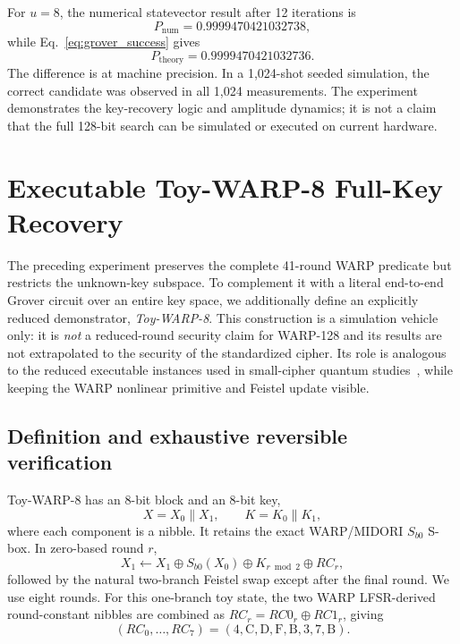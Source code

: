 \documentclass[10pt,a4paper]{article}
\begin{document}
For $u=8$, the numerical statevector result after 12 iterations is
\begin{equation}
    P_{\mathrm{num}}=0.9999470421032738,
\end{equation}
while Eq.~\eqref{eq:grover_success} gives
\begin{equation}
    P_{\mathrm{theory}}=0.9999470421032736.
\end{equation}
The difference is at machine precision. In a 1,024-shot seeded simulation, the correct candidate was observed in all 1,024 measurements. The experiment demonstrates the key-recovery logic and amplitude dynamics; it is not a claim that the full 128-bit search can be simulated or executed on current hardware.


\section{Executable Toy-WARP-8 Full-Key Recovery}
\label{sec:toywarp8}

The preceding experiment preserves the complete 41-round WARP predicate but restricts the unknown-key subspace.  To complement it with a literal end-to-end Grover circuit over an entire key space, we additionally define an explicitly reduced demonstrator, \emph{Toy-WARP-8}.  This construction is a simulation vehicle only: it is \emph{not} a reduced-round security claim for WARP-128 and its results are not extrapolated to the security of the standardized cipher.  Its role is analogous to the reduced executable instances used in small-cipher quantum studies~\cite{Kiran2026}, while keeping the WARP nonlinear primitive and Feistel update visible.

\subsection{Definition and exhaustive reversible verification}
Toy-WARP-8 has an 8-bit block and an 8-bit key,
\begin{equation}
    X=X_0\|X_1,\qquad K=K_0\|K_1,
\end{equation}
where each component is a nibble.  It retains the exact WARP/MIDORI $S_{b0}$ S-box.  In zero-based round $r$,
\begin{equation}
    X_1\leftarrow X_1\oplus S_{b0}(X_0)\oplus K_{r\bmod 2}\oplus RC_r,
    \label{eq:toywarp_round}
\end{equation}
followed by the natural two-branch Feistel swap except after the final round.  We use eight rounds.  For this one-branch toy state, the two WARP LFSR-derived round-constant nibbles are combined as $RC_r=RC0_r\oplus RC1_r$, giving
\begin{equation}
    (RC_0,\ldots,RC_7)=(4,\mathrm{C},\mathrm{D},\mathrm{F},\mathrm{B},3,7,\mathrm{B}).
\end{equation}
\end{document}
